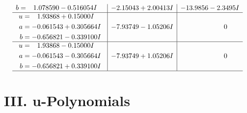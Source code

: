 \documentclass[1p]{elsarticle_modified}
\theoremstyle{definition}
\begin{document}
$$\begin{array}{c|c|c}
\begin{aligned}
b &= \phantom{-}1.078590 - 0.516054 I\end{aligned}
 & -2.15043 + 2.00413 I & -13.9856 - 2.3495 I \\ \hline\begin{aligned}
u &= \phantom{-}1.93868 + 0.15000 I \\
a &= -0.061543 + 0.305664 I \\
b &= -0.656821 - 0.339100 I\end{aligned}
 & -7.93749 - 1.05206 I & \phantom{-0.000000 } 0 \\ \hline\begin{aligned}
u &= \phantom{-}1.93868 - 0.15000 I \\
a &= -0.061543 - 0.305664 I \\
b &= -0.656821 + 0.339100 I\end{aligned}
 & -7.93749 + 1.05206 I & \phantom{-0.000000 } 0\\
 \hline 
 \end{array}$$\newpage
\newpage\renewcommand{\arraystretch}{1}
\centering \section*{ III. u-Polynomials}
\end{document}
